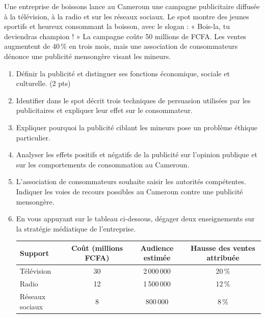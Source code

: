 \documentclass[11pt]{article}
\begin{document}
\begin{exercice}
Une entreprise de boissons lance au Cameroun une campagne publicitaire diffusée à la télévision, à la radio et sur les réseaux sociaux. Le spot montre des jeunes sportifs et heureux consommant la boisson, avec le slogan : « Bois-la, tu deviendras champion ! » La campagne coûte 50 millions de FCFA. Les ventes augmentent de 40\,\% en trois mois, mais une association de consommateurs dénonce une publicité mensongère visant les mineurs.
\begin{enumerate}
\item Définir la publicité et distinguer ses fonctions économique, sociale et culturelle. (2 pts)
\item Identifier dans le spot décrit trois techniques de persuasion utilisées par les publicitaires et expliquer leur effet sur le consommateur.
\item Expliquer pourquoi la publicité ciblant les mineurs pose un problème éthique particulier.
\item Analyser les effets positifs et négatifs de la publicité sur l'opinion publique et sur les comportements de consommation au Cameroun.
\item L'association de consommateurs souhaite saisir les autorités compétentes. Indiquer les voies de recours possibles au Cameroun contre une publicité mensongère.
\item En vous appuyant sur le tableau ci-dessous, dégager deux enseignements sur la stratégie médiatique de l'entreprise.
\begin{center}
\begin{tabular}{|l|c|c|c|}
\hline
\textbf{Support} & \textbf{Coût (millions FCFA)} & \textbf{Audience estimée} & \textbf{Hausse des ventes attribuée}\\
\hline
Télévision & 30 & 2\,000\,000 & 20\,\%\\
\hline
Radio & 12 & 1\,500\,000 & 12\,\%\\
\hline
Réseaux sociaux & 8 & 800\,000 & 8\,\%\\
\hline
\end{tabular}
\end{center}
\end{enumerate}
\end{exercice}
\end{document}
